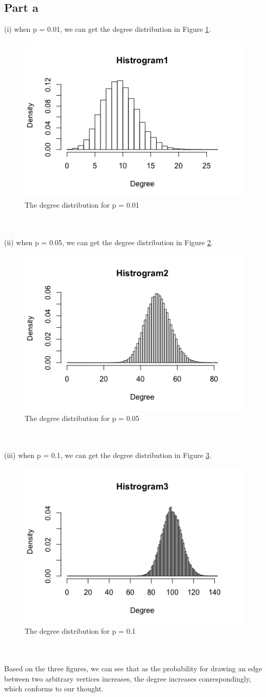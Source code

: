 \documentclass{article}
\begin{document}
\subsection{Part a}
(i) when p = 0.01, we can get the degree distribution in Figure \ref{fig:p1_1}.
\begin{figure}[htbp]
\centering
\includegraphics[width=.6\textwidth]{p1_1.png}
\caption{The degree distribution for p = 0.01}
\label{fig:p1_1}
\end{figure}\\
\\
(ii) when p = 0.05, we can get the degree distribution in Figure \ref{fig:p1_2}.
\begin{figure}[htbp]
\centering
\includegraphics[width=.6\textwidth]{p1_2.png}
\caption{The degree distribution for p = 0.05}
\label{fig:p1_2}
\end{figure}\\
\\
(iii) when p = 0.1, we can get the degree distribution in Figure \ref{fig:p1_3}.
\begin{figure}[htbp]
\centering
\includegraphics[width=.6\textwidth]{p1_3.png}
\caption{The degree distribution for p = 0.1}
\label{fig:p1_3}
\end{figure}\\
\\
Based on the three figures, we can see that as the probability for drawing an edge between two arbitrary vertices increases, the degree increases conrespondingly, which conforms to our thought. 
\end{document}
